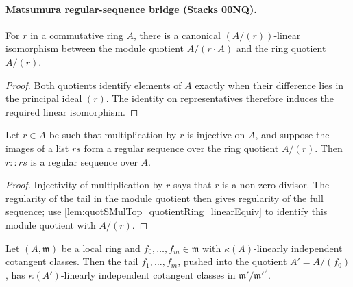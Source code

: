 \paragraph{Matsumura regular-sequence bridge (Stacks 00NQ).}

\begin{lemma}\leanok
  \label{lem:quotSMulTop_quotientRing_linearEquiv}
  For \(r\) in a commutative ring \(A\), there is a canonical \((A/(r))\)-linear
  isomorphism between the module quotient \(A/(r \cdot A)\) and the ring quotient
  \(A/(r)\).
\end{lemma}

\begin{proof}
  Both quotients identify elements of \(A\) exactly when their difference
  lies in the principal ideal \((r)\).  The identity on representatives
  therefore induces the required linear isomorphism.
\end{proof}

\begin{lemma}\leanok
  \label{lem:isRegular_cons_of_quotient_ring}
  Let \(r \in A\) be such that multiplication by \(r\) is injective on \(A\), and
  suppose the images of a list \(rs\) form a regular sequence over the ring quotient
  \(A/(r)\). Then \(r :: rs\) is a regular sequence over \(A\).
\end{lemma}

\begin{proof}
  Injectivity of multiplication by \(r\) says that \(r\) is a
  non-zero-divisor.  The regularity of the tail in the module quotient
  then gives regularity of the full sequence; use
  \cref{lem:quotSMulTop_quotientRing_linearEquiv} to identify this module
  quotient with \(A/(r)\).
\end{proof}

\begin{lemma}\leanok
  \label{lem:matsumura_descent_cotangent}
  Let \((A, \mathfrak m)\) be a local ring and \(f_0,\dots,f_m \in \mathfrak m\) with
  \(\kappa(A)\)-linearly independent cotangent classes. Then the tail
  \(f_1,\dots,f_m\), pushed into the quotient \(A' = A/(f_0)\), has
  \(\kappa(A')\)-linearly independent cotangent classes in
  \(\mathfrak m'/\mathfrak m'^2\).
\end{lemma}

